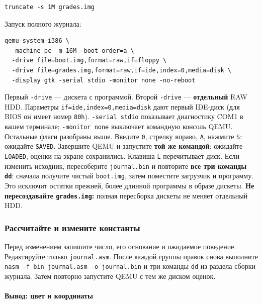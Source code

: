 \begin{verbatim}
truncate -s 1M grades.img
\end{verbatim}

Запуск полного журнала:

\begin{verbatim}
qemu-system-i386 \
  -machine pc -m 16M -boot order=a \
  -drive file=boot.img,format=raw,if=floppy \
  -drive file=grades.img,format=raw,if=ide,index=0,media=disk \
  -display gtk -serial stdio -monitor none -no-reboot
\end{verbatim}

Первый \texttt{-drive} --- дискета с программой. Второй \texttt{-drive}
--- \textbf{отдельный} RAW HDD. Параметры
\texttt{if=ide,index=0,media=disk} дают первый IDE-диск (для BIOS он
имеет номер \texttt{80h}). \texttt{-serial\ stdio} показывает
диагностику COM1 в вашем терминале; \texttt{-monitor\ none} выключает
командную консоль QEMU. Остальные флаги разобраны выше. Введите
\texttt{0}, стрелку вправо, \texttt{A}, нажмите \texttt{S}: ожидайте
\texttt{SAVED}. Завершите QEMU и запустите \textbf{той же командой}:
ожидайте \texttt{LOADED}, оценки на экране сохранились. Клавиша
\texttt{L} перечитывает диск. Если изменить исходник, пересоберите
\texttt{journal.bin} и повторите \textbf{все три команды \texttt{dd}}:
сначала получите чистый \texttt{boot.img}, затем поместите загрузчик и
программу. Это исключит остатки прежней, более длинной программы в
образе дискеты. \textbf{Не пересоздавайте \texttt{grades.img}:} полная
пересборка дискеты не меняет отдельный HDD.

\hypertarget{ux440ux430ux441ux441ux447ux438ux442ux430ux439ux442ux435-ux438-ux438ux437ux43cux435ux43dux438ux442ux435-ux43aux43eux43dux441ux442ux430ux43dux442ux44b}{%
\subsubsection{Рассчитайте и измените
константы}\label{ux440ux430ux441ux441ux447ux438ux442ux430ux439ux442ux435-ux438-ux438ux437ux43cux435ux43dux438ux442ux435-ux43aux43eux43dux441ux442ux430ux43dux442ux44b}}

Перед изменением запишите число, его основание и ожидаемое поведение.
Редактируйте только \texttt{journal.asm}. После каждой группы правок
снова выполните \texttt{nasm\ -f\ bin\ journal.asm\ -o\ journal.bin} и
три команды \texttt{dd} из раздела сборки журнала. Затем повторно
запустите QEMU с тем же диском оценок.

\hypertarget{ux432ux44bux432ux43eux434-ux446ux432ux435ux442-ux438-ux43aux43eux43eux440ux434ux438ux43dux430ux442ux44b}{%
\paragraph{Вывод: цвет и
координаты}\label{ux432ux44bux432ux43eux434-ux446ux432ux435ux442-ux438-ux43aux43eux43eux440ux434ux438ux43dux430ux442ux44b}}

